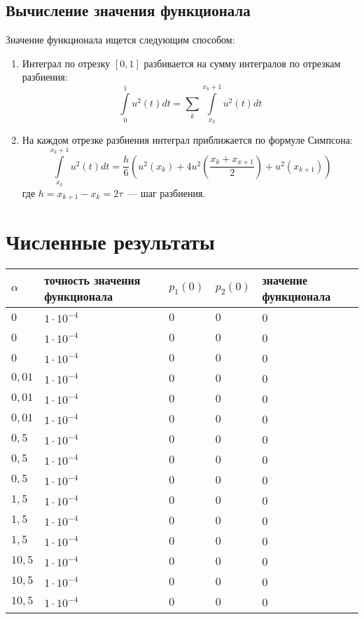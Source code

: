 \documentclass[24pt]{article}
\begin{document}
\subsection{Вычисление значения функционала}
Значение функционала ищется следующим способом:\\
\begin{enumerate}
\item 
Интеграл по отрезку $[0,1]$ разбивается на сумму интегралов по отрезкам разбиения:
$$ \int\limits_0^1 u^2(t) dt = \sum\limits_k\int\limits_{x_k}^{x_k+1}u^2(t)dt$$
\item
На каждом отрезке разбиения интеграл приближается по формуле Симпсона:\\
$$\int\limits_{x_k}^{x_k+1}u^2(t)dt = \frac{h}{6}\left(u^2\left(x_k\right) + 4u^2\left(\frac{x_k + x_{x+1}}{2}\right)+u^2\left(x_{k+1}\right)\right)$$
где $h = x_{k+1}-x_{k} = 2\tau$~--- шаг разбиения.
\end{enumerate}
\section{Численные результаты}
\begin{tabular}[t]{||l|l|l|l|l||}
\hline
$\alpha$ & точность значения функционала & $p_1(0)$ & $p_2(0)$ & значение функционала\\
\hline\hline
$0$& $1\cdot 10^{-4}$ & $0$ & $0$ & 0\\
\hline
$0$& $1\cdot 10^{-4}$ & $0$ & $0$ & 0\\
\hline
$0$& $1\cdot 10^{-4}$ & $0$ & $0$ & 0\\
\hline
$0{,}01$& $1\cdot 10^{-4}$ & $0$ & $0$ & 0\\
\hline
$0{,}01$& $1\cdot 10^{-4}$ & $0$ & $0$ & 0\\
\hline
$0{,}01$& $1\cdot 10^{-4}$ & $0$ & $0$ & 0\\
\hline
$0{,}5$& $1\cdot 10^{-4}$ & $0$ & $0$ & 0\\
\hline
$0{,}5$& $1\cdot 10^{-4}$ & $0$ & $0$ & 0\\
\hline
$0{,}5$& $1\cdot 10^{-4}$ & $0$ & $0$ & 0\\
\hline
$1{,}5$& $1\cdot 10^{-4}$ & $0$ & $0$ & 0\\
\hline
$1{,}5$& $1\cdot 10^{-4}$ & $0$ & $0$ & 0\\
\hline
$1{,}5$& $1\cdot 10^{-4}$ & $0$ & $0$ & 0\\
\hline
$10{,}5$& $1\cdot 10^{-4}$ & $0$ & $0$ & 0\\
\hline
$10{,}5$& $1\cdot 10^{-4}$ & $0$ & $0$ & 0\\
\hline
$10{,}5$& $1\cdot 10^{-4}$ & $0$ & $0$ & 0\\
\hline
\end{tabular}
\end{document}
